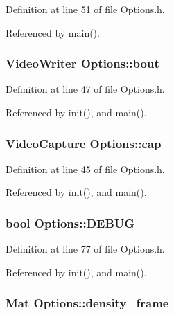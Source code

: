 \-Definition at line 51 of file \-Options.\-h.



\-Referenced by main().

\hypertarget{class_options_a05a239b7ee3dc2731c2e929af24070ef}{
\subsubsection[{bout}]{\setlength{\rightskip}{0pt plus 5cm}\-Video\-Writer {\bf \-Options\-::bout}}}
\label{class_options_a05a239b7ee3dc2731c2e929af24070ef}


\-Definition at line 47 of file \-Options.\-h.



\-Referenced by init(), and main().

\hypertarget{class_options_a3c6618c646e82eac20efed6796817796}{
\subsubsection[{cap}]{\setlength{\rightskip}{0pt plus 5cm}\-Video\-Capture {\bf \-Options\-::cap}}}
\label{class_options_a3c6618c646e82eac20efed6796817796}


\-Definition at line 45 of file \-Options.\-h.



\-Referenced by init(), and main().

\hypertarget{class_options_a22414840e13de871e6182c2b0781ae5b}{
\subsubsection[{\-D\-E\-B\-U\-G}]{\setlength{\rightskip}{0pt plus 5cm}bool {\bf \-Options\-::\-D\-E\-B\-U\-G}}}
\label{class_options_a22414840e13de871e6182c2b0781ae5b}


\-Definition at line 77 of file \-Options.\-h.



\-Referenced by init(), and main().

\hypertarget{class_options_a0f0729b7b9d38b511319f89b7daec944}{
\subsubsection[{density\-\_\-frame}]{\setlength{\rightskip}{0pt plus 5cm}\-Mat {\bf \-Options\-::density\-\_\-frame}}}
\label{class_options_a0f0729b7b9d38b511319f89b7daec944}


